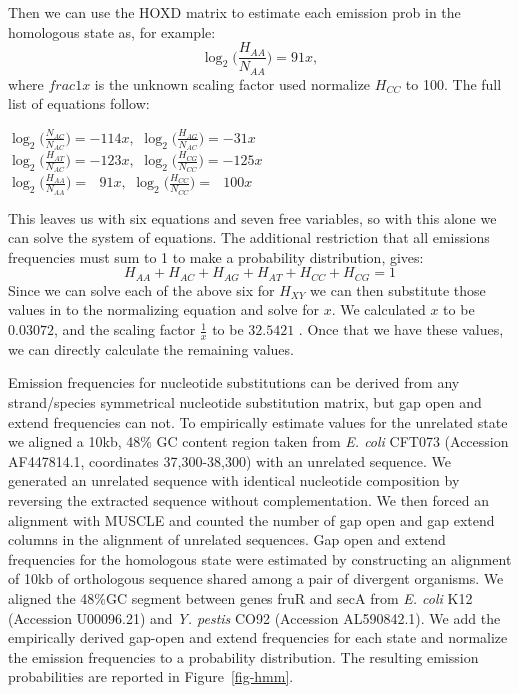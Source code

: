 \documentclass{ws-procs975x65}
\begin{document}
Then we can use the HOXD matrix to estimate each emission prob in the homologous
state as, for example:
\begin{equation}
\log_{2}\bigg(\frac{H_{AA}}{N_{AA}}\bigg) = 91x,
\end{equation}
where $frac{1}{x}$ is the unknown scaling factor used normalize $H_{CC}$ to 100. The full list of equations follow:
\begin{center}$\log_{2}\bigg(\frac{N_{AC}}{N_{AC}}\bigg) = -114x,$
$\log_{2}\bigg(\frac{H_{AG}}{N_{AC}}\bigg) = -31x$ \\
$\log_{2}\bigg(\frac{H_{AT}}{N_{AC}}\bigg) = -123x,$
$\log_{2}\bigg(\frac{H_{CG}}{N_{CC}}\bigg) = -125x$ \\
$\log_{2}\bigg(\frac{H_{AA}}{N_{AA}}\bigg) = \ \ \ 91x,$
$\log_{2}\bigg(\frac{H_{CC}}{N_{CC}}\bigg) = \ \ \ 100x$ \\
\end{center}

This leaves us with six equations and seven free variables, so with this alone we can solve the system of equations. The additional restriction that all emissions frequencies must sum to 1 to make a probability distribution, gives:
\begin{equation}
H_{AA} + H_{AC} + H_{AG} + H_{AT} + H_{CC} + H_{CG} = 1
\end{equation}
Since we can solve each of the above six for $H_{XY}$ we can then substitute those values in to the
normalizing equation and solve for $x$. We calculated $x$ to be $0.03072$, and the scaling factor $\frac{1}{x}$ to be $32.5421$ . Once that we have these values, we can directly calculate the remaining values.

Emission frequencies for nucleotide substitutions can be derived from any strand/species symmetrical nucleotide substitution matrix, but gap open and extend frequencies can not.  To empirically estimate values for the unrelated state we aligned a 10kb, 48\% GC content region taken from \emph{E. coli} CFT073 (Accession AF447814.1, coordinates 37,300-38,300) with an unrelated sequence.  We generated an unrelated sequence with identical nucleotide composition by reversing the extracted sequence without complementation.  We then forced an alignment with MUSCLE and counted the number of gap open and gap extend columns in the alignment of unrelated sequences.  Gap open and extend frequencies for the homologous state were estimated by constructing an alignment of 10kb of orthologous sequence shared among a pair of divergent organisms.  We aligned the 48\%GC segment between genes fruR and secA from \textit{E. coli} K12 (Accession U00096.21) and \emph{Y. pestis} CO92 (Accession AL590842.1). We add the empirically derived gap-open and extend frequencies for each state and normalize the emission frequencies to a probability distribution.  The resulting emission probabilities are reported in Figure~\ref{fig-hmm}.
\end{document}
